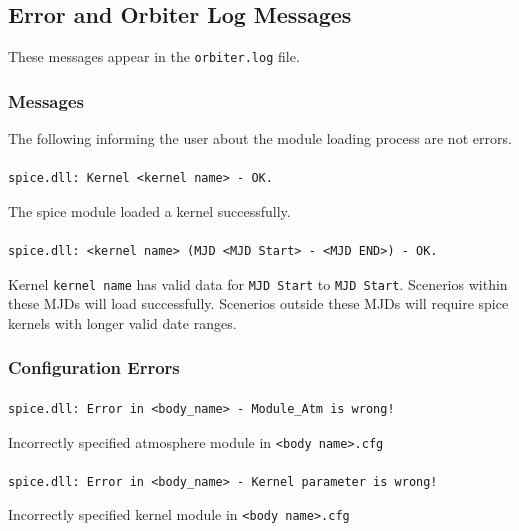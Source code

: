 \documentclass[Orbiter Technical Reference.tex]{subfiles}
\begin{document}
\subsection{Error and Orbiter Log Messages}

These messages appear in the \texttt{orbiter.log} file.


\subsubsection{Messages}

The following informing the user about the module loading process are not errors.\\

\paragraph{}
\begin{verbatim}
spice.dll: Kernel <kernel name> - OK.
\end{verbatim}
The spice module loaded a kernel successfully.

\paragraph{}
\begin{verbatim}
spice.dll: <kernel name> (MJD <MJD Start> - <MJD END>) - OK.
\end{verbatim}
Kernel \texttt{kernel name} has valid data for \texttt{MJD Start} to \texttt{MJD Start}. Scenerios within these MJDs will load successfully.
Scenerios outside these MJDs will require spice kernels with longer valid date ranges.

\subsubsection{Configuration Errors}

\paragraph{}
\begin{verbatim}
spice.dll: Error in <body_name> - Module_Atm is wrong!
\end{verbatim}
Incorrectly specified atmosphere module in \texttt{<body name>.cfg}

\paragraph{}
\begin{verbatim}
spice.dll: Error in <body_name> - Kernel parameter is wrong!
\end{verbatim}
Incorrectly specified kernel module in \texttt{<body name>.cfg}
\end{document}
